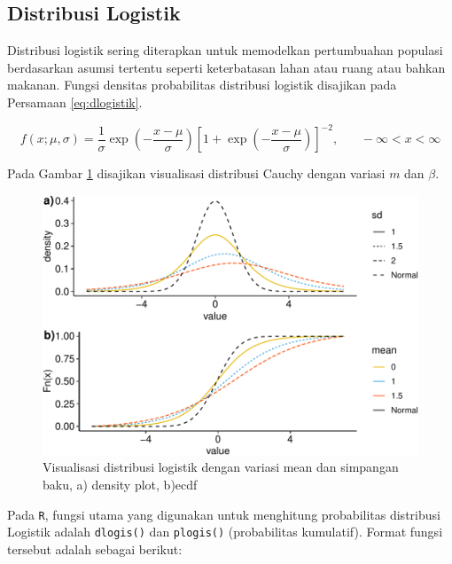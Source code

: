 \documentclass[]{book}
\begin{document}
\subsection{Distribusi Logistik}\label{distribusi-logistik}

Distribusi logistik sering diterapkan untuk memodelkan pertumbuahan
populasi berdasarkan asumsi tertentu seperti keterbatasan lahan atau
ruang atau bahkan makanan. Fungsi densitas probabilitas distribusi
logistik disajikan pada Persamaan \eqref{eq:dlogistik}.

\begin{equation}
   f\left(x;\mu,\sigma\right)=\frac{1}{\sigma}\exp\left(-\frac{x-\mu}{\sigma}\right)\left[1+\exp\left(-\frac{x-\mu}{\sigma}\right)\right]^{-2},\ \ \ \ \ \ \ \ -\infty<x<\infty
  \label{eq:dlogistik}
\end{equation}

Pada Gambar \ref{fig:dlogistikvis} disajikan visualisasi distribusi
Cauchy dengan variasi \(m\) dan \(\beta\).

\begin{figure}

{\centering \includegraphics[width=0.9\linewidth]{EnvStat_files/figure-latex/dlogistikvis-1} 

}

\caption{Visualisasi distribusi logistik dengan variasi mean dan simpangan baku, a) density plot, b)ecdf}\label{fig:dlogistikvis}
\end{figure}

Pada \texttt{R}, fungsi utama yang digunakan untuk menghitung
probabilitas distribusi Logistik adalah \texttt{dlogis()} dan
\texttt{plogis()} (probabilitas kumulatif). Format fungsi tersebut
adalah sebagai berikut:
\end{document}
